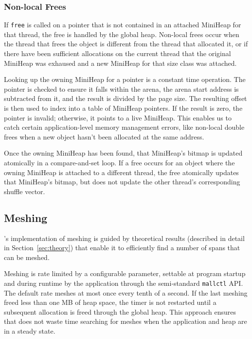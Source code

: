 \subsubsection{Non-local Frees}

If \texttt{free} is called on a pointer that is not contained in an
attached MiniHeap for that thread, the free is handled by the global
heap.  Non-local frees occur when the thread that frees the object is
different from the thread that allocated it, or if there have been
sufficient allocations on the current thread that the original
MiniHeap was exhaused and a new MiniHeap for that size class was
attached.

Looking up the owning MiniHeap for a pointer is a constant time
operation. The pointer is checked to ensure it falls within the arena,
the arena start address is subtracted from it, and the result is
divided by the page size.  The resulting offset is then used to index
into a table of MiniHeap pointers. If the result is zero, the pointer
is invalid; otherwise, it points to a live MiniHeap.  This enables us
to catch certain application-level memory management errors, like
non-local double frees when a new object hasn't been allocated at the
same address.

Once the owning MiniHeap has been found, that MiniHeap's bitmap is
updated atomically in a compare-and-set loop.  If a free occurs for an
object where the owning MiniHeap is attached to a different thread,
the free atomically updates that MiniHeap's bitmap, but does not
update the other thread's corresponding shuffle vector.


\subsection{Meshing}
\label{sec:meshing-implementation}

\Mesh's implementation of meshing is guided by theoretical results
(described in detail in Section~\ref{sec:theory}) that enable it to
efficiently find a number of spans that can be meshed.

Meshing is rate limited by a configurable parameter, settable at
program startup and during runtime by the application through the
semi-standard \texttt{mallctl} API.  The default rate meshes at most
once every tenth of a second.  If the last meshing freed less than one
MB of heap space, the timer is not restarted until a subsequent
allocation is freed through the global heap.  This approach ensures that \Mesh
does not waste time searching for meshes when the application and heap
are in a steady state.

